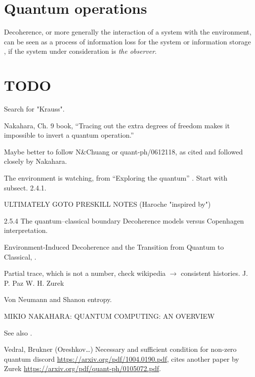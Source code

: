 \section{Quantum operations}

Decoherence,
or more generally the interaction of a system with the environment,
can be seen as a process of information loss for the system
\parencite[Ch. 9]{Nakahara} or information storage
\parencite{Zurek_Einselect}, if the system under consideration
is \emph{the observer}.

\section{TODO}

Search for "Krauss".

Nakahara, Ch. 9 book, ``Tracing out the extra degrees of freedom makes it impossible to invert a quantum operation.''

Maybe better to follow N\&Chuang or quant-ph/0612118, as cited and followed closely
by Nakahara.

The environment is watching, from ``Exploring the quantum''
\parencite[Ch. 4]{Haroche_Exploring}. Start with subsect. 2.4.1.

ULTIMATELY GOTO PRESKILL NOTES (Haroche "inspired by")

2.5.4 The quantum–classical boundary
Decoherence models versus Copenhagen interpretation.

Environment-Induced Decoherence and the Transition from Quantum to Classical,
\cite{Zurek_Fundamentals}.

Partial trace, which is not a number, check wikipedia $\rightarrow$ consistent histories.
J. P. Paz W. H. Zurek

Von Neumann and Shanon entropy.

MIKIO NAKAHARA: QUANTUM COMPUTING: AN OVERVIEW

See also \cite{Schlosshauer_Decoherence}.

Vedral, Brukner (Oreshkov\dots)
Necessary and sufficient condition for non-zero quantum discord
\url{https://arxiv.org/pdf/1004.0190.pdf},
cites another paper by Zurek \url{https://arxiv.org/pdf/quant-ph/0105072.pdf}.
